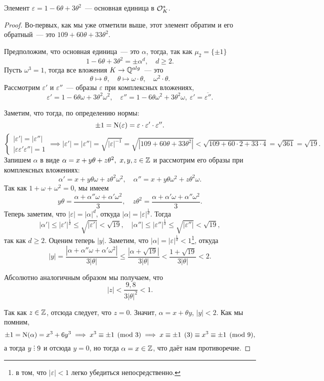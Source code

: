 	\begin{statement} 
		Элемент $\varepsilon = 1 - 6\theta + 3\theta^2$~--- основная единица в $\mathcal{O}_{K}^*$.
	\end{statement}
		
	\begin{proof}
		Во-первых, как мы уже отметили выше, этот элемент обратим и его обратный~--- это $109 + 60\theta + 33\theta^2$. 

		Предположим, что основная единица~--- это $\alpha$, тогда, так как $\mu_2 = \{ \pm 1 \}$ 
		\[
			1 - 6\theta + 3 \theta^2 = \pm \alpha^d, \quad d \ge 2.
		\]
		Пусть $\omega^3 = 1$, тогда все вложения $K \to \mathbb{Q}^{alg}$~--- это 
		\[
			\theta \mapsto \theta, \quad \theta \mapsto \omega \cdot \theta, \quad \omega^2 \cdot \theta.
		\]
		Рассмотрим $\varepsilon'$ и $\varepsilon''$~--- образы $\varepsilon$ при комплексных вложениях, 
		\[
			\varepsilon' = 1 - 6\theta \omega + 3 \theta^2 \omega^2, \quad \varepsilon'' = 1 - 6\theta \omega^2 + 3\theta^2 \omega, \ \varepsilon' = \overline{\varepsilon''}. 
		\]

		Заметим, что тогда, по определению нормы:
		\[
			\pm 1 = \operatorname{\mathrm{N}}(\varepsilon) = \varepsilon \cdot \varepsilon' \cdot \varepsilon''.
		\]
		\[
			\begin{cases} |\varepsilon'| = |\varepsilon''| \\ |\varepsilon \varepsilon' \varepsilon''| = 1  \end{cases} \implies |\varepsilon'| = |\varepsilon''| = \sqrt{|\varepsilon|^{-1}} = \sqrt{|109 + 60\theta + 33\theta^2|} < \sqrt{109 + 60 \cdot 2 + 33 \cdot 4} = \sqrt{361} = \sqrt{19}.
		\]
		Запишем $\alpha$ в виде $\alpha = x + y\theta + z\theta^2, \ x, y, z \in \mathbb{Z}$ и рассмотрим его образы при комплексных вложениях: 
		\[
			\alpha' = x + y\theta\omega + z\theta^2\omega^2, \quad \alpha'' = x + y\theta \omega^2 + z \theta^2 \omega. 
		\]
		Так как $1 + \omega + \omega^2 = 0$, мы имеем 
		\[
			y\theta = \frac{\alpha + \alpha''\omega + \alpha'\omega^2}{3}, \quad z \theta^2 = \frac{\alpha + \alpha' \omega + \alpha'' \omega^2}{3}.
		\]
		Теперь заметим, что $|\varepsilon| = |\alpha|^d$, откуда $|\alpha| = |\varepsilon|^{\frac{1}{d}}$. Тогда 
		\[
			|\alpha'| \le |\varepsilon'|^{\frac{1}{d}} \le \sqrt{|\varepsilon'|} < \sqrt{19}, \quad |\alpha''| \le |\varepsilon''|^{\frac{1}{d}} \le \sqrt{|\varepsilon''|} < \sqrt{19},
		\]
		так как $d \ge 2$. Оценим теперь $|y|$. Заметим, что $|\alpha| = |\varepsilon|^{\frac{1}{d}} < 1$\footnote{в том, что $|\varepsilon| < 1$ легко убедиться непосредственно.}, откуда 
		\[
			|y| = \frac{|\alpha + \alpha'' \omega + \alpha' \omega^2|}{3|\theta|} \le \frac{|\alpha + \sqrt{19}|}{3|\theta|} < \frac{1 + \sqrt{19}}{3|\theta|} < 2.
		\]

		Абсолютно аналогичным образом мы получаем, что 
		\[
			|z| < \frac{9,8}{3|\theta|^2} < 1.
		\]

		Так как $z \in \mathbb{Z}$, отсюда следует, что $z = 0$. Значит, $\alpha = x + \theta y$, $|y| < 2$. Как мы помним, 
		\[
			\pm 1 = \operatorname{\mathrm{N}}(\alpha) = x^3 + 6y^3 \implies x^3 \equiv \pm 1 \pmod{3} \implies x \equiv \pm 1 \pod{3} \equiv x^3 \equiv \pm 1 \pmod{9},
		\]
		а тогда $y \divby 9$ и отсюда $y = 0$, но тогда $\alpha = x \in \mathbb{Z}$, что даёт нам противоречие. 
	\end{proof}

